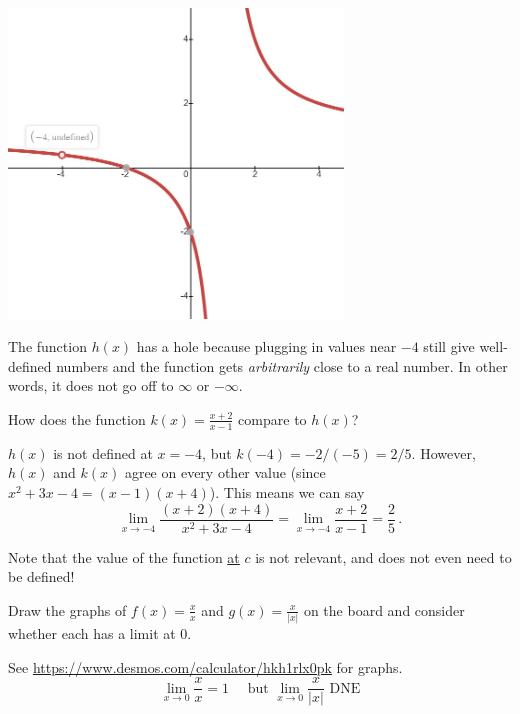 \documentclass[11pt]{exam}
\begin{document}
\begin{questions}
\includegraphics[width=3.5in]{Figures/rational.jpg}
\begin{solution}
  The function \(h(x)\) has a hole because plugging in values near \(-4\) still
  give well-defined numbers and the function gets \emph{arbitrarily}
  close to a real number. In other words, it does not go off to
  \(\infty\) or \(-\infty\). 
\end{solution}
How does the function $k(x)=\displaystyle\frac{x+2}{x-1}$ compare to $h(x)$?
\begin{solution}
  \(h(x)\) is not defined at \(x=-4\), but \(k(-4) = -2/(-5) =
  2/5\). However, \(h(x)\) and \(k(x)\) agree on every other
  value (since \(x^2+3x-4 = (x-1)(x+4)\)). This means we can say \[
    \lim_{x \to -4} \frac{(x+2)(x+4)}{x^2+3x-4} = \lim_{x \to -4}
    \frac{x+2}{x-1} = \frac{2}{5} \,.
  \]
\end{solution}
\pagebreak
%
%

\vspace{-0.1in}
\noindent{}
Note that the value of the function \underline{at} $c$ is not
relevant, and does not even need to be defined!

\question Draw the graphs of $f(x) =\displaystyle \frac{x}{x}$ and
$g(x) = \displaystyle \frac{x}{|x|}$ on the board and consider whether each has a limit at 0.
\begin{solution}
  See
  \href{https://www.desmos.com/calculator/hkh1rlx0pk}{https://www.desmos.com/calculator/hkh1rlx0pk}
  for graphs. \[
    \lim_{x\to 0} \frac{x}{x} = 1 \quad\text{ but } \lim_{x \to 0}
    \frac{x}{|x|} \text{ DNE}
  \]
\end{solution}


\end{questions}
\end{document}
